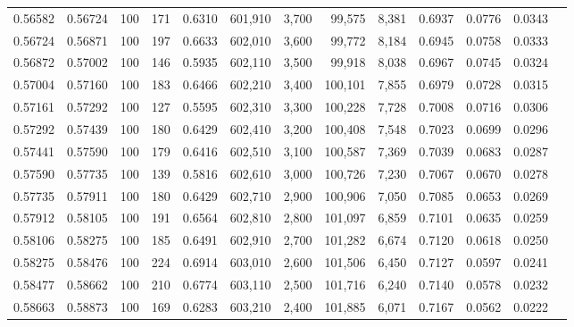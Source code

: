 \begin{tabular}{rrrrrrrrrrrrr}
0.56582 & 0.56724 &    100 & 171 &                                     0.6310 & 601,910 &   3,700 &  99,575 &   8,381 & 0.6937 & 0.0776 & 0.0343 \\
0.56724 & 0.56871 &    100 & 197 &                                     0.6633 & 602,010 &   3,600 &  99,772 &   8,184 & 0.6945 & 0.0758 & 0.0333 \\
0.56872 & 0.57002 &    100 & 146 &                                     0.5935 & 602,110 &   3,500 &  99,918 &   8,038 & 0.6967 & 0.0745 & 0.0324 \\
0.57004 & 0.57160 &    100 & 183 &                                     0.6466 & 602,210 &   3,400 & 100,101 &   7,855 & 0.6979 & 0.0728 & 0.0315 \\
0.57161 & 0.57292 &    100 & 127 &                                     0.5595 & 602,310 &   3,300 & 100,228 &   7,728 & 0.7008 & 0.0716 & 0.0306 \\
0.57292 & 0.57439 &    100 & 180 &                                     0.6429 & 602,410 &   3,200 & 100,408 &   7,548 & 0.7023 & 0.0699 & 0.0296 \\
0.57441 & 0.57590 &    100 & 179 &                                     0.6416 & 602,510 &   3,100 & 100,587 &   7,369 & 0.7039 & 0.0683 & 0.0287 \\
0.57590 & 0.57735 &    100 & 139 &                                     0.5816 & 602,610 &   3,000 & 100,726 &   7,230 & 0.7067 & 0.0670 & 0.0278 \\
0.57735 & 0.57911 &    100 & 180 &                                     0.6429 & 602,710 &   2,900 & 100,906 &   7,050 & 0.7085 & 0.0653 & 0.0269 \\
0.57912 & 0.58105 &    100 & 191 &                                     0.6564 & 602,810 &   2,800 & 101,097 &   6,859 & 0.7101 & 0.0635 & 0.0259 \\
0.58106 & 0.58275 &    100 & 185 &                                     0.6491 & 602,910 &   2,700 & 101,282 &   6,674 & 0.7120 & 0.0618 & 0.0250 \\
0.58275 & 0.58476 &    100 & 224 &                                     0.6914 & 603,010 &   2,600 & 101,506 &   6,450 & 0.7127 & 0.0597 & 0.0241 \\
0.58477 & 0.58662 &    100 & 210 &                                     0.6774 & 603,110 &   2,500 & 101,716 &   6,240 & 0.7140 & 0.0578 & 0.0232 \\
0.58663 & 0.58873 &    100 & 169 &                                     0.6283 & 603,210 &   2,400 & 101,885 &   6,071 & 0.7167 & 0.0562 & 0.0222 \\

\end{tabular}
